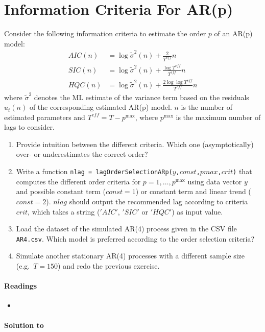 \section[Information Criteria For AR{(p)}]{Information Criteria For AR{(p)}\label{ex:InformationCriteriaARp}}
Consider the following information criteria to estimate the order \(p\) of an AR{(p)} model: 
\begin{align*}
AIC(n)  &= \log\tilde{\sigma}^2(n) + \frac{2}{T^{eff}}n
\\
SIC(n)  &= \log\tilde{\sigma}^2(n) + \frac{\log T^{eff}}{T^{eff}}n
\\
HQC(n)  &= \log\tilde{\sigma}^2(n) + \frac{2\log \log T^{eff}}{T^{eff}}n
\end{align*}
where \(\tilde{\sigma}^2\) denotes the ML estimate of the variance term
based on the residuals \(\hat{u}_t(n)\) of the corresponding estimated AR{(p)} model.
\(n\) is the number of estimated parameters and \(T^{eff}=T-p^{\text{max}}\),
  where \(p^{\text{max}}\) is the maximum number of lags to consider.

\begin{enumerate}

\item
Provide intuition between the different criteria.
Which one (asymptotically) over- or underestimates the correct order?

\item Write a function \texttt{nlag = lagOrderSelectionARp{(\(y\),\(const\),\(pmax\),\(crit\))}}
  that computes the different order criteria for \(p = 1,\ldots ,p^{\text{max}}\)
  using data vector \(y\) and possible constant term (\(const=1\))
  or constant term and linear trend (\(const=2\)).
\(nlag\) should output the recommended lag according to criteria \(crit\),
  which takes a string (\('AIC'\), \('SIC'\) or \('HQC'\)) as input value.

\item
Load the dataset of the simulated AR{(4)} process given in the CSV file \texttt{AR4.csv}.
Which model is preferred according to the order selection criteria?

\item Simulate another stationary AR{(4)} processes with a different sample size (e.g.\
  \(T = 150\)) and redo the previous exercise.

\end{enumerate}

\paragraph{Readings}
\begin{itemize}
\item \textcite{Lutkepohl_2004_UnivariateTimeSeries}
\end{itemize}

\begin{solution}\textbf{Solution to }
\ifDisplaySolutions%

\fi
\newpage
\end{solution}